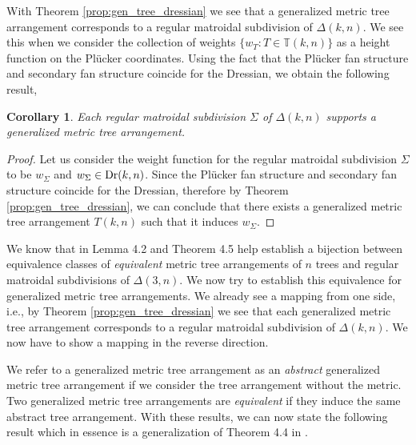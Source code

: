 \documentclass[12pt]{article}
\newcommand{\TT}{\mathbb{T}}
\DeclareMathOperator{\Dr}{\rm Dr}
\theoremstyle{plain}
\newtheorem{corollary}[theorem]{Corollary}
\theoremstyle{definition}
\numberwithin{subcase}{case}
\newcommand\Myperm[2][^n]{\prescript{#1\mkern-2.5mu}{}P_{#2}}
\begin{document}
With Theorem \ref{prop:gen_tree_dressian} we see that a generalized metric tree arrangement corresponds to a regular matroidal subdivision of $\Delta(k,n)$. We see this when we consider the collection of weights $\{w_T \colon T \in \TT(k,n) \}$ as a height function on the Pl\"ucker coordinates. Using the fact that the Pl\"ucker fan structure and secondary fan structure coincide for the Dressian, we obtain the following result,

\begin{corollary}\label{lem:sub_to_gen_trees}
Each regular matroidal subdivision $\Sigma$ of $\Delta(k,n)$ supports a generalized metric tree arrangement.  
\end{corollary}


\begin{proof}
Let us consider the weight function for the regular matroidal subdivision $\Sigma$ to be $w_{\Sigma}$ and $w_{\Sigma} \in \Dr(k,n)$. Since the Pl\"ucker fan structure and secondary fan structure coincide for the Dressian, therefore by Theorem \ref{prop:gen_tree_dressian}, we can conclude that there exists a generalized metric tree arrangement $T(k,n)$ such that it induces $w_{\Sigma}$.
\end{proof}


We know that in \cite{herrmann2009draw} Lemma 4.2 and Theorem 4.5 help establish a bijection between equivalence classes of \emph{equivalent} metric tree arrangements of $n$ trees and regular matroidal subdivisions of $\Delta(3,n)$. We now try to establish this equivalence for generalized metric tree arrangements. We already see a mapping from one side, i.e., by Theorem \ref{prop:gen_tree_dressian} we see that each generalized metric tree arrangement corresponds to a regular matroidal subdivision of $\Delta(k,n)$. We now have to show a mapping in the reverse direction. 

We refer to a generalized metric tree arrangement as an \emph{abstract} generalized metric tree arrangement if we consider the tree arrangement without the metric. Two generalized metric tree arrangements are \emph{equivalent} if they induce the same abstract tree arrangement. With these results, we can now state the following result which in essence is a generalization of Theorem 4.4 in \cite{herrmann2009draw}.
\end{document}
